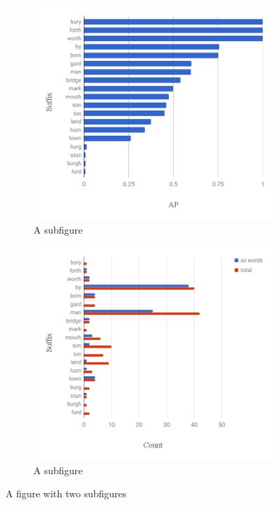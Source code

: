 \documentclass[ms,electronic,twosidetoc,letterpaper,chaptercenter,parttop,lol,lof,lot]{byumsphd}
\begin{document}
\begin{figure}
\centering
\begin{subfigure}{.5\textwidth}
  \centering
  \includegraphics[width=.99\linewidth]{suffix_IAM_ap}
  \caption{A subfigure}
  \label{fig:sub1}
\end{subfigure}%
\begin{subfigure}{.5\textwidth}
  \centering
  \includegraphics[width=.99\linewidth]{suffix_IAM_count}
  \caption{A subfigure}
  \label{fig:sub2}
\end{subfigure}
\caption{A figure with two subfigures}
\label{fig:test}
\end{figure}
\end{document}
